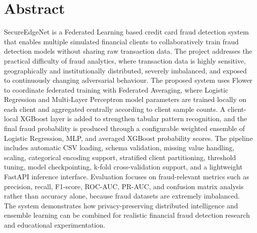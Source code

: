 \chapter*{Abstract}%
%

SecureEdgeNet is a Federated Learning based credit card fraud detection system that enables multiple simulated financial clients to collaboratively train fraud detection models without sharing raw transaction data. The project addresses the practical difficulty of fraud analytics, where transaction data is highly sensitive, geographically and institutionally distributed, severely imbalanced, and exposed to continuously changing adversarial behaviour. The proposed system uses Flower to coordinate federated training with Federated Averaging, where Logistic Regression and Multi-Layer Perceptron model parameters are trained locally on each client and aggregated centrally according to client sample counts. A client-local XGBoost layer is added to strengthen tabular pattern recognition, and the final fraud probability is produced through a configurable weighted ensemble of Logistic Regression, MLP, and averaged XGBoost probability scores. The pipeline includes automatic CSV loading, schema validation, missing value handling, scaling, categorical encoding support, stratified client partitioning, threshold tuning, model checkpointing, k-fold cross-validation support, and a lightweight FastAPI inference interface. Evaluation focuses on fraud-relevant metrics such as precision, recall, F1-score, ROC-AUC, PR-AUC, and confusion matrix analysis rather than accuracy alone, because fraud datasets are extremely imbalanced. The system demonstrates how privacy-preserving distributed intelligence and ensemble learning can be combined for realistic financial fraud detection research and educational experimentation.
\thispagestyle{plain}

